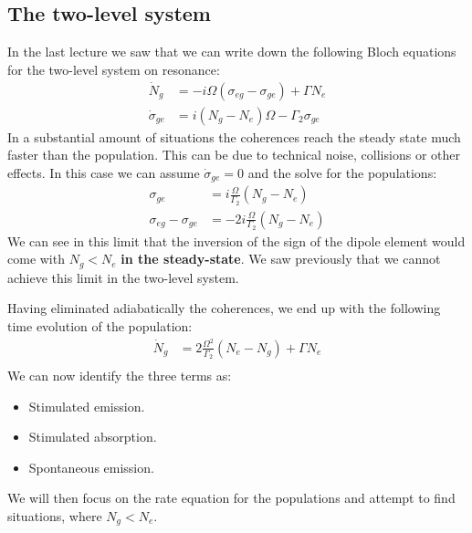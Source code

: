 \documentclass[10pt]{article}
\begin{document}
\subsection{The two-level system}

In the last lecture we saw that we can write down the following Bloch equations for the two-level system on resonance:
\begin{align}
\dot{N}_g &= -i\Omega(\sigma_{eg}-\sigma_{ge})+\Gamma N_e\\
\dot{\sigma}_{ge}&= i (N_g-N_e)\Omega-\Gamma_2\sigma_{ge}
\end{align}
In a substantial amount of situations the coherences reach the steady state much faster than the population. This can be due to technical noise, collisions or other effects. In this case we can assume $\dot{\sigma}_{ge}=0$ and the solve for the populations:
\begin{align}
\sigma_{ge}&= i \frac{\Omega}{\Gamma_2} (N_g-N_e)\\
\sigma_{eg}-\sigma_{ge} &= -2i \frac{\Omega}{\Gamma_2} (N_g-N_e)
\end{align}
We can see in this limit that the inversion of the sign of the dipole element would come with $N_g < N_e$ \textbf{in the steady-state}. We saw previously that we cannot achieve this limit in the two-level system.


Having eliminated adiabatically the coherences, we end up with the following time evolution of the population:
\begin{align}
\dot{N}_g &= 2\frac{\Omega^2}{\Gamma_2}(N_e-N_g)+\Gamma N_e\\
\end{align}
We can now identify the three terms as:
\begin{itemize}
\item Stimulated emission.
\item Stimulated absorption.
\item Spontaneous emission.
\end{itemize}
We will then focus on the rate equation for the populations and attempt to find situations, where $N_g < N_e$.
\end{document}
